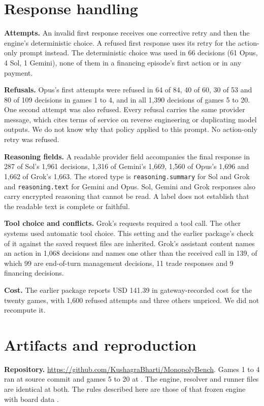 \section{Response handling}
\label{app:handling}
\textbf{Attempts.} An invalid first response receives one corrective retry and then the engine's deterministic choice. A refused first response uses its retry for the action-only prompt instead. The deterministic choice was used in 66 decisions (61 Opus, 4 Sol, 1 Gemini), none of them in a financing episode's first action or in any payment.

\textbf{Refusals.} Opus's first attempts were refused in 64 of 84, 40 of 60, 30 of 53 and 80 of 109 decisions in games 1 to 4, and in all 1,390 decisions of games 5 to 20. One second attempt was also refused. Every refusal carries the same provider message, which cites terms of service on reverse engineering or duplicating model outputs. We do not know why that policy applied to this prompt. No action-only retry was refused.

\textbf{Reasoning fields.} A readable provider field accompanies the final response in 287 of Sol's 1,961 decisions, 1,316 of Gemini's 1,669, 1,560 of Opus's 1,696 and 1,662 of Grok's 1,663. The stored type is \texttt{reasoning.summary} for Sol and Grok and \texttt{reasoning.text} for Gemini and Opus. Sol, Gemini and Grok responses also carry encrypted reasoning that cannot be read. A label does not establish that the readable text is complete or faithful.

\textbf{Tool choice and conflicts.} Grok's requests required a tool call. The other systems used automatic tool choice. This setting and the earlier package's check of it against the saved request files are inherited. Grok's assistant content names an action in 1,068 decisions and names one other than the received call in 139, of which 99 are end-of-turn management decisions, 11 trade responses and 9 financing decisions.

\textbf{Cost.} The earlier package reports USD 141.39 in gateway-recorded cost for the twenty games, with 1,600 refused attempts and three others unpriced. We did not recompute it.

\section{Artifacts and reproduction}
\label{app:artifacts}
\textbf{Repository.} \url{https://github.com/KushagraBharti/MonopolyBench}. Games 1 to 4 ran at source commit  and games 5 to 20 at . The engine, resolver and runner files are identical at both. The rules described here are those of that frozen engine with board data .

